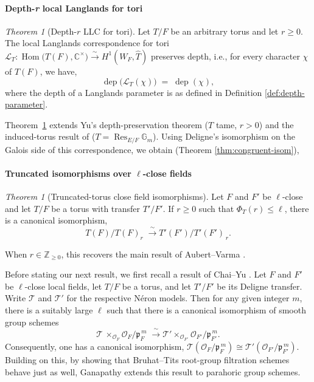 \documentclass[american]{article}
\numberwithin{equation}{section}
\numberwithin{figure}{section}
\theoremstyle{plain}
\theoremstyle{definition}
\theoremstyle{remark}
\newcounter{thmA}
\newtheorem{theoremA}[thmA]{Theorem}
\DeclareMathOperator{\Hom}{Hom}
\DeclareMathOperator{\Res}{Res}
\newcommand{\cO}{\mathcal{O}}
\begin{document}
\paragraph{Depth-\textit{r} local Langlands for tori}
\begin{theoremA}[Depth-$r$ LLC for tori]\label{thm:A}
Let $T/F$ be an arbitrary torus and let $r\ge0$. The  local Langlands correspondence for tori
$\mathcal L_T\colon\Hom\!\bigl(T(F),\mathbb{C}^\times\bigr)\xrightarrow{\sim} H^1(W_F,\widehat T)$
preserves depth, i.e., for every character $\chi$ of $T(F)$, we have,
        \[
          \operatorname{dep}\bigl(\mathcal L_T(\chi)\bigr)
          \;=\;
         \!\operatorname{dep}(\chi),
        \]
where the depth of a Langlands parameter is as defined in Definition \ref{def:depth-parameter}.
\end{theoremA}
Theorem~\ref{thm:A} extends Yu's depth-preservation theorem (\(T\) tame, \(r>0\)) and the induced-torus result of \cite{MishraPattanayak2015} (\(T=\Res_{E/F}\mathbb{G}_m\)).
\smallskip
Using Deligne's isomorphism on the Galois side of this correspondence, we obtain (Theorem \ref{thm:congruent-isom}),
\paragraph{Truncated isomorphisms over $\ell$-close fields}
\begin{theoremA}[Truncated-torus close field isomorphisms]\label{thm:B}
Let $F$ and $F'$ be $\ell$-close and let $T/F$ be a torus with
transfer $T'/F'$.  If $r\geq 0$ such that $\Phi_T(r)\leq \ell$, there is a canonical
isomorphism,
\[
   T(F)\big/\!T(F)_r
   \;\xrightarrow{\;\sim\;}
   T'(F')\big/\!T'(F')_{\,r}.
\]

\end{theoremA}
When $r\in\mathbb{Z}_{\ge0}$, this recovers the main result of Aubert--Varma \cite{AV24}.
\smallskip

Before stating our next result, we first recall a result of  Chai--Yu \cite{ChaiYu2001}.
Let \(F\) and \(F'\) be \(\ell\)-close local fields, let \(T/F\) be a torus, and let \(T'/F'\) be its Deligne transfer.
Write \(\mathscr{T}\) and \(\mathscr{T}'\) for the respective N\'{e}ron models.  Then for any given integer \(m\), there is a suitably large \(\ell\) such that there is a canonical isomorphism of smooth group schemes
\[
   \mathscr{T}\,\times_{\cO_F}
        \cO_F/\mathfrak {p}_F^{\,m}
   \;\xrightarrow{\;\sim\;}
   \mathscr{T}'\times_{\cO_{F'}}
        \cO_{F'}/\mathfrak {p}_{F'}^{\,m}.
\]
Consequently, one has a canonical isomorphism,
\(
   \mathscr T(\cO_F/\mathfrak {p}_F^{\,m})
   \cong
   \mathscr T'(\cO_{F'}/\mathfrak {p}_{F'}^{\,m}).
\) Building on this, by showing that Bruhat--Tits root-group filtration schemes behave just as well, Ganapathy \cite[Cor.]{ganapathy2019} extends this result to parahoric group schemes.
\smallskip
\end{document}
